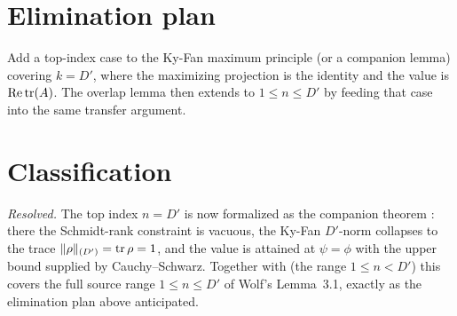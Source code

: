 \documentclass{article}
\begin{document}
\section{Elimination plan}

Add a top-index case to the Ky-Fan maximum principle (or a companion lemma)
covering $k=D'$, where the maximizing projection is the identity and the value
is $\operatorname{Re}\operatorname{tr}(A)$. The overlap lemma then extends to $1\le n\le D'$
by feeding that case into the same transfer argument.

\section{Classification}

\emph{Resolved.} The top index $n=D'$ is now formalized as the companion theorem
: there the Schmidt-rank
constraint is vacuous, the Ky-Fan $D'$-norm collapses to the trace
$\|\rho\|_{(D')}=\operatorname{tr}\rho=1$, and the value is attained at $\psi=\phi$ with the
upper bound supplied by Cauchy--Schwarz. Together with
 (the range $1\le n<D'$) this
covers the full source range $1\le n\le D'$ of Wolf's Lemma~3.1, exactly as the
elimination plan above anticipated.



\end{document}

